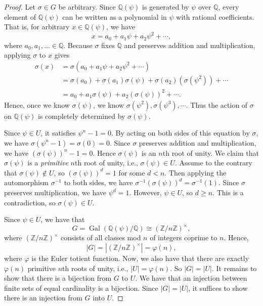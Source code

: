 \documentclass{article}
\DeclareMathOperator{\Gal}{Gal}
\begin{document}
    \begin{proof}
        Let $\sigma\in G$ be arbitrary. Since $\mathbb{Q}(\psi)$ is generated by $\psi$ over $\mathbb{Q}$, every element of $\mathbb{Q}(\psi)$ can be written as a polynomial in $\psi$ with rational coefficients. That is, for arbitrary $x\in\mathbb{Q}(\psi)$, we have \[x = a_0+a_1\psi+a_2\psi^2+\cdots,\] where $a_0,a_1,\ldots\in\mathbb{Q}$. Because $\sigma$ fixes $\mathbb{Q}$ and preserves addition and multiplication, applying $\sigma$ to $x$ gives
        \begin{align*}
            \sigma(x) &= \sigma(a_0 + a_1\psi+a_2\psi^2+\cdots)\\
            &=\sigma(a_0) + \sigma(a_1)\sigma(\psi) + \sigma(a_2)(\sigma(\psi^2))+\cdots\\
            &=a_0+a_1\sigma(\psi)+a_2(\sigma(\psi))^2+\cdots.
        \end{align*}
        Hence, once we know $\sigma(\psi)$, we know $\sigma(\psi^2), \sigma(\psi^3),\cdots$. Thus the action of $\sigma$ on $\mathbb{Q}(\psi)$ is completely determined by $\sigma(\psi)$.
        
        Since $\psi\in U$, it satisfies $\psi^n-1=0$. By acting on both sides of this equation by $\sigma$, we have $\sigma(\psi^n-1)=\sigma(0)=0$. Since $\sigma$ preserves addition and multiplication, we have $(\sigma(\psi))^n-1=0$. Hence $\sigma(\psi)$ is an $n$th root of unity. We claim that $\sigma(\psi)$ is a \emph{primitive} $n$th root of unity, i.e., $\sigma(\psi)\in U$. Assume to the contrary that $\sigma(\psi)\notin U$, so $(\sigma(\psi))^d=1$ for some $d<n$. Then applying the automorphism $\sigma^{-1}$ to both sides, we have $\sigma^{-1}(\sigma(\psi))^d=\sigma^{-1}(1)$. Since $\sigma$ preserves multiplication, we have $\psi^d=1$. However, $\psi\in U$, so $d\geq n$. This is a contradiction, so $\sigma(\psi)\in U$.
    
        Since $\psi\in U$, we have that \[G=\Gal(\mathbb{Q}(\psi)/\mathbb{Q})\cong(\mathbb{Z}/n\mathbb{Z})^{\times},\] where $(\mathbb{Z}/n\mathbb{Z})^\times$ consists of all classes mod $n$ of integers coprime to $n$. \cite{dummit,gannon} Hence, \[|G|=|(\mathbb{Z}/n\mathbb{Z})^\times|=\varphi(n),\] where $\varphi$ is the Euler totient function. Now, we also have that there are exactly $\varphi(n)$ primitive $n$th roots of unity, i.e., $|U|=\varphi(n)$. So $|G|=|U|$. It remains to show that there is a bijection from $G$ to $U$. We have that an injection between finite sets of equal cardinality is a bijection. Since $|G|=|U|$, it suffices to show there is an injection from $G$ into $U$.
        

\end{proof}
\end{document}
